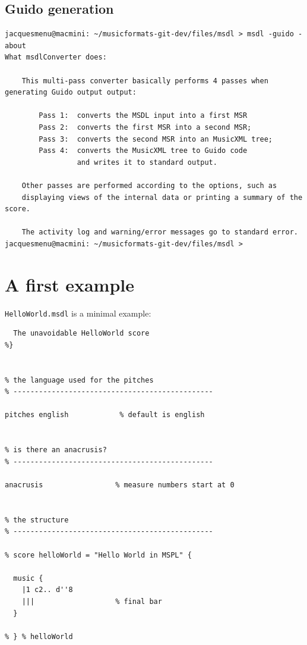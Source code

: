 \subsection{Guido generation}

\begin{lstlisting}[language=Terminal]
jacquesmenu@macmini: ~/musicformats-git-dev/files/msdl > msdl -guido -about
What msdlConverter does:

    This multi-pass converter basically performs 4 passes when generating Guido output output:

        Pass 1:  converts the MSDL input into a first MSR
        Pass 2:  converts the first MSR into a second MSR;
        Pass 3:  converts the second MSR into an MusicXML tree;
        Pass 4:  converts the MusicXML tree to Guido code
                 and writes it to standard output.

    Other passes are performed according to the options, such as
    displaying views of the internal data or printing a summary of the score.

    The activity log and warning/error messages go to standard error.
jacquesmenu@macmini: ~/musicformats-git-dev/files/msdl >

\end{lstlisting}

\section{A first example}

{\tt HelloWorld.msdl} is a minimal example:
\begin{lstlisting}[language=CPlusPlus]
%{
  The unavoidable HelloWorld score
%}


% the language used for the pitches
% -----------------------------------------------

pitches english            % default is english


% is there an anacrusis?
% -----------------------------------------------

anacrusis                 % measure numbers start at 0


% the structure
% -----------------------------------------------

% score helloWorld = "Hello World in MSPL" {

  music {
    |1 c2.. d''8
    |||                   % final bar
  }

% } % helloWorld
\end{lstlisting}


